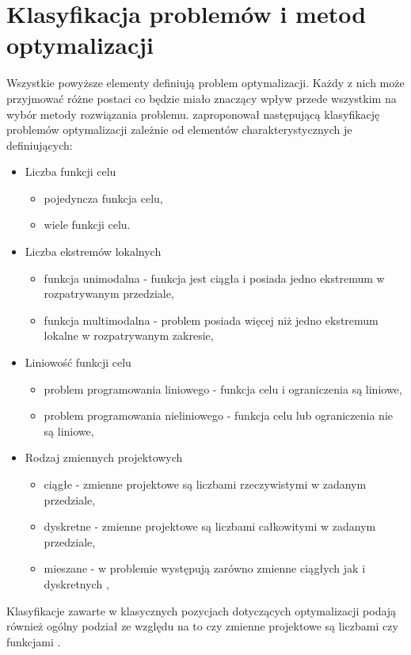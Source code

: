 \section{Klasyfikacja problemów i metod\\optymalizacji}
Wszystkie powyższe elementy definiują problem optymalizacji. Każdy z nich może przyjmować różne postaci co będzie miało znaczący wpływ przede wszystkim na wybór metody rozwiązania problemu. \cite{Tesch2016} zaproponował następującą klasyfikację problemów optymalizacji zależnie od elementów charakterystycznych je definiujących:
\begin{itemize}[noitemsep]
	\item Liczba funkcji celu
	\begin{itemize}[noitemsep]
		\item pojedyncza funkcja celu,
		\item wiele funkcji celu.
	\end{itemize}
	\item Liczba ekstremów lokalnych
	\begin{itemize}[noitemsep]
		\item funkcja unimodalna - funkcja jest ciągła i posiada jedno ekstremum w rozpatrywanym przedziale,
		\item funkcja multimodalna - problem posiada więcej niż jedno ekstremum lokalne w rozpatrywanym zakresie,
	\end{itemize}
	\item Liniowość funkcji celu
	\begin{itemize}[noitemsep]
		\item problem programowania liniowego - funkcja celu i ograniczenia są liniowe,
		\item problem programowania nieliniowego - funkcja celu lub ograniczenia nie są liniowe,
	\end{itemize}
	\item Rodzaj zmiennych projektowych
	\begin{itemize}[noitemsep]
		\item ciągłe - zmienne projektowe są liczbami rzeczywistymi w zadanym przedziale,
		\item dyskretne - zmienne projektowe są liczbami całkowitymi w zadanym przedziale,
		\item mieszane - w problemie występują zarówno zmienne ciągłych jak i dyskretnych ,
	\end{itemize}
\end{itemize}

Klasyfikacje zawarte w klasycznych pozycjach dotyczących optymalizacji podają również ogólny podział ze względu na to czy zmienne projektowe są liczbami czy funkcjami \parencite{Szymczak1995,Findeisen1980}.

